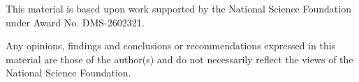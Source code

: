 This material is based upon work supported by the National Science Foundation under Award No. DMS-2602321.

Any opinions, findings and conclusions or recommendations expressed in this material are those of the author(s) and do not necessarily reflect the views of the National Science Foundation.
